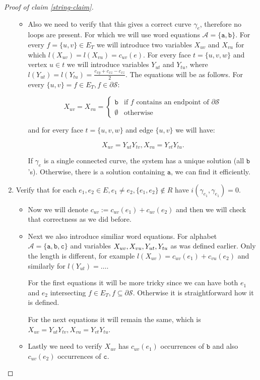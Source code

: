 \begin{proof}[Proof of claim \ref{string-claim}]
\begin{enumerate}
\begin{itemize}
			\item Also we need to verify that this gives a correct curve $\gamma_e$, therefore no loops are present. For which we will use word equations $\mathcal{A} = \{\mathtt{a}, \mathtt{b}\}$. For every $f = \{u,v\} \in E_T$ we will introduce two variables $X_{uv}$ and $X_{vu}$ for which $l(X_{uv}) = l(X_{vu}) = c_{uv}(e)$. For every face $t = \{u,v,w\}$ and vertex $u \in t$ we will introduce variables $Y_{ut}$ and $Y_{tu}$, where $l(Y_{ut}) = l(Y_{tu}) = \frac{c_{xy} + c_{xz} - c_{xz}}{2}$. The equations will be as follows. For every $\{u,v\} = f \in E_T, f \in \partial \mathcal{S}$:
			
			$$
			X_{uv} = X_{vu} =
			\left\{
			\begin{array}{ll}
				\mathtt{b} & \text{if } f \text{ contains an endpoint of } \partial \mathcal{S}\\
				\emptyset & \text{otherwise}
			\end{array}
			\right.
			$$
			
			\noindent and for every face $t = \{u,v,w\}$ and edge $\{u,v\}$ we will have:
			
			$$
			X_{uv} = Y_{ut} Y_{tv}, X_{vu} = Y_{vt} Y_{tu}.
			$$
			
			\begin{observ}
				If $\gamma_e$ is a single connected curve, the system has a unique solution (all $\mathtt{b}$'s). Otherwise, there is a solution containing $\mathtt{a}$, we can find it efficiently.
			\end{observ}
		\end{itemize}
		\item Verify that for each $e_1,e_2 \in E, e_1 \neq e_2, \{e_1,e_2\} \notin R$ have $i (\gamma_{e_1}, \gamma_{e_1}) = 0$.
		
		\begin{itemize}
			\item Now we will denote $c_{uv} := c_{uv}(e_1) + c_{uv}(e_2)$ and then we will check that correctness as we did before.
			\item Next we also introduce similiar word equations. For alphabet $\mathcal{A} = \{\mathtt{a}, \mathtt{b}, \mathtt{c}\}$ and variables $X_{uv}, X_{vu},\\ Y_{ut}, Y_{tu}$ as was defined earlier. Only the length is different, for example $l(X_{uv}) = c_{uv} (e_1) + c_{vu}(e_2)$ and similarly for $l(Y_{ut}) = \dots$.
			
			For the first equations it will be more tricky since we can have both $e_1$ and $e_2$ intersecting $f \in E_T, f \subseteq \partial\mathcal{S}$. Otherwise it is straightforward how it is defined.
			
			For the next equations it will remain the same, which is $X_{uv} = Y_{ut} Y_{tv}, X_{vu} = Y_{vt} Y_{tu}$.
			
			\item Lastly we need to verify $X_{uv}$ has $c_{uv}(e_1)$ occurrences of $\mathtt{b}$ and also $c_{uv}(e_2)$ occurrences of $\mathtt{c}$.
		\end{itemize}
	\end{enumerate}
\end{proof}


